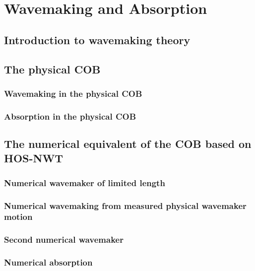\chapter{Wavemaking and Absorption}\label{ch:wavemaking}


\section{Introduction to wavemaking theory}


\section{The physical COB}
\subsection{Wavemaking in the physical COB}

\subsection{Absorption in the physical COB}

\section{The numerical equivalent of the COB based on HOS-NWT}
\subsection{Numerical wavemaker of limited length}

\subsection{Numerical wavemaking from measured physical wavemaker motion}

\subsection{Second numerical wavemaker}

\subsection{Numerical absorption}

\cleardoublepage

